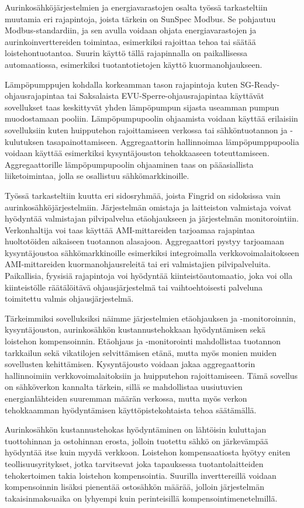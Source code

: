 Aurinkosähköjärjestelmien ja energiavarastojen osalta työssä tarkasteltiin muutamia eri rajapintoja, joista tärkein on SunSpec Modbus. Se pohjautuu Modbus-standardiin, ja sen avulla voidaan ohjata energiavarastojen ja aurinkoinverttereiden toimintaa, esimerkiksi rajoittaa tehoa tai säätää loistehontuotantoa. Suurin käyttö tällä rajapinnalla on paikallisessa automaatiossa, esimerkiksi tuotantotietojen käyttö kuormanohjaukseen.

Lämpöpumppujen kohdalla korkeamman tason rajapintoja kuten SG-Ready-ohjausrajapintaa tai Saksalaista EVU-Sperre-ohjausrajapintaa käyttävät sovellukset taas keskittyvät yhden lämpöpumpun sijasta useamman pumpun muodostamaan pooliin. Lämpöpumpupoolin ohjaamista voidaan käyttää erilaisiin sovelluksiin kuten huipputehon rajoittamiseen verkossa tai sähköntuotannon ja -kulutuksen tasapainottamiseen. Aggregaattorin hallinnoimaa lämpöpumppupoolia voidaan käyttää esimerkiksi kysyntäjouston tehokkaaseen toteuttamiseen. Aggregaattorille lämpöpumpupoolin ohjaaminen taas on pääasiallista liiketoimintaa, jolla se osallistuu sähkömarkkinoille.

Työssä tarkasteltiin kuutta eri sidosryhmää, joista Fingrid on sidoksissa vain aurinkosähköjärjestelmiin. Järjestelmän omistaja ja laitteiston valmistaja voivat hyödyntää valmistajan pilvipalvelua etäohjaukseen ja järjestelmän monitorointiin. Verkonhaltija voi taas käyttää AMI-mittareiden tarjoamaa rajapintaa huoltotöiden aikaiseen tuotannon alasajoon. Aggregaattori pystyy tarjoamaan kysyntäjoustoa sähkömarkkinoille esimerkiksi integroimalla verkkovoimalaitokseen AMI-mittareiden kuormanohjausreleitä tai eri valmistajien pilvipalveluita. Paikallisia, fyysisiä rajapintoja voi hyödyntää kiinteistöautomaatio, joka voi olla kiinteistölle räätälöitävä ohjausjärjestelmä tai vaihtoehtoisesti palveluna toimitettu valmis ohjausjärjestelmä.

Tärkeimmiksi sovelluksiksi näimme järjestelmien etäohjauksen ja -monitoroinnin, kysyntäjouston, aurinkosähkön kustannustehokkaan hyödyntämisen sekä loistehon kompensoinnin. Etäohjaus ja -monitorointi mahdollistaa tuotannon tarkkailun sekä vikatilojen selvittämisen etänä, mutta myös monien muiden sovellusten kehittämisen. Kysyntäjousto voidaan jakaa aggregaattorin hallinnoimiin verkkovoimalaitoksiin ja huipputehon rajoittamiseen. Tämä sovellus on sähköverkon kannalta tärkein, sillä se mahdollistaa uusiutuvien energianlähteiden suuremman määrän verkossa, mutta myös verkon tehokkaamman hyödyntämisen käyttöpistekohtaista tehoa säätämällä. 

Aurinkosähkön kustannustehokas hyödyntäminen on lähtöisin kuluttajan tuottohinnan ja ostohinnan erosta, jolloin tuotettu sähkö on järkevämpää hyödyntää itse kuin myydä verkkoon. Loistehon kompensaatiosta hyötyy eniten teollisuusyritykset, jotka tarvitsevat joka tapauksessa tuotantolaitteiden tehokertoimen takia loistehon kompensointia. Suurilla inverttereillä voidaan kompensoinnin lisäksi pienentää ostosähkön määrää, jolloin järjestelmän takaisinmaksuaika on lyhyempi kuin perinteisillä kompensointimenetelmillä.
